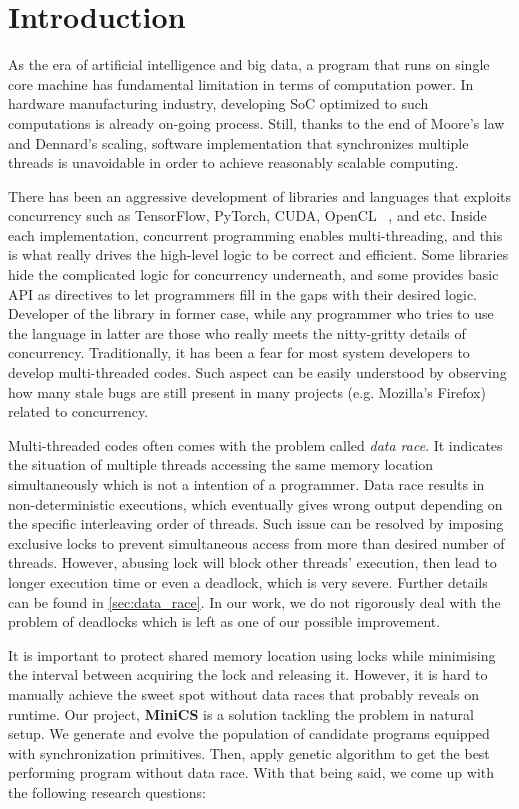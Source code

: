 \section{Introduction}
\label{sec:intro}

As the era of artificial intelligence and big data, a program that runs on single core machine has fundamental limitation in terms of computation power. In hardware manufacturing industry, developing SoC optimized to such computations is already on-going process. Still, thanks to the end of Moore's law and Dennard's scaling, software implementation that synchronizes multiple threads is unavoidable in order to achieve reasonably scalable computing.

There has been an aggressive development of libraries and languages that exploits concurrency such as TensorFlow, PyTorch, CUDA, OpenCL ~\cite{Bruce2018RN1}, and etc. Inside each implementation, concurrent programming enables multi-threading, and this is what really drives the high-level logic to be correct and efficient. Some libraries hide the complicated logic for concurrency underneath, and some provides basic API as directives to let programmers fill in the gaps with their desired logic. Developer of the library in former case, while any programmer who tries to use the language in latter are those who really meets the nitty-gritty details of concurrency. Traditionally, it has been a fear for most system developers to develop multi-threaded codes. Such aspect can be easily understood by observing how many stale bugs are still present in many projects (e.g. Mozilla's Firefox) related to concurrency.

Multi-threaded codes often comes with the problem called \textit{data race}. It indicates the situation of multiple threads accessing the same memory location simultaneously which is not a intention of a programmer. Data race results in non-deterministic executions, which eventually gives wrong output depending on the specific interleaving order of threads. Such issue can be resolved by imposing exclusive locks to prevent simultaneous access from more than desired number of threads. However, abusing lock will block other threads' execution, then lead to longer execution time or even a deadlock, which is very severe. Further details can be found in \ref{sec:data_race}. In our work, we do not rigorously deal with the problem of deadlocks which is left as one of our possible improvement.

It is important to protect shared memory location using locks while minimising the interval between acquiring the lock and releasing it. However, it is hard to manually achieve the sweet spot without data races that probably reveals on runtime. Our project, \textbf{MiniCS} is a solution tackling the problem in natural setup. We generate and evolve the population of candidate programs equipped with synchronization primitives. Then, apply genetic algorithm to get the best performing program without data race. With that being said, we come up with the following research questions:

